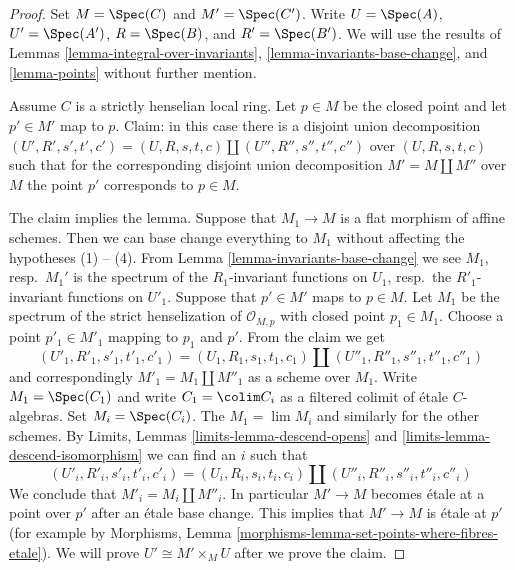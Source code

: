 \begin{proof}
Set $M = \Spec(C)$ and $M' = \Spec(C')$.
Write $U = \Spec(A)$, $U' = \Spec(A')$, $R = \Spec(B)$, and
$R' = \Spec(B')$. We will use the results of
Lemmas \ref{lemma-integral-over-invariants},
\ref{lemma-invariants-base-change}, and
\ref{lemma-points}
without further mention.

\medskip\noindent
Assume $C$ is a strictly henselian local ring. Let $p \in M$
be the closed point and let $p' \in M'$ map to $p$.
Claim: in this case there is a disjoint union decomposition
$(U', R', s', t', c') = (U, R, s, t, c) \amalg (U'', R'', s'', t'', c'')$
over $(U, R, s, t, c)$ such that for the corresponding
disjoint union decomposition $M' = M \amalg M''$ over $M$
the point $p'$ corresponds to $p \in M$.

\medskip\noindent
The claim implies the lemma. Suppose that $M_1 \to M$ is a flat morphism
of affine schemes. Then we can base change everything to $M_1$
without affecting the hypotheses (1) -- (4).
From Lemma \ref{lemma-invariants-base-change}
we see $M_1$, resp.\ $M_1'$ is the spectrum of the
$R_1$-invariant functions on $U_1$,
resp.\ the $R'_1$-invariant functions on $U'_1$.
Suppose that $p' \in M'$ maps to $p \in M$.
Let $M_1$ be the spectrum of the strict henselization of
$\mathcal{O}_{M, p}$ with closed point $p_1 \in M_1$.
Choose a point $p'_1 \in M'_1$ mapping to $p_1$ and $p'$.
From the claim we get
$$
(U'_1, R'_1, s'_1, t'_1, c'_1) =
(U_1, R_1, s_1, t_1, c_1) \amalg
(U''_1, R''_1, s''_1, t''_1, c''_1)
$$
and correspondingly $M'_1 = M_1 \amalg M''_1$ as a scheme over $M_1$.
Write $M_1 = \Spec(C_1)$ and write $C_1 = \colim C_i$ as a filtered
colimit of \'etale $C$-algebras. Set $M_i = \Spec(C_i)$.
The $M_1 = \lim M_i$ and similarly for the other schemes.
By Limits, Lemmas \ref{limits-lemma-descend-opens} and
\ref{limits-lemma-descend-isomorphism}
we can find an $i$ such that
$$
(U'_i, R'_i, s'_i, t'_i, c'_i) =
(U_i, R_i, s_i, t_i, c_i) \amalg
(U''_i, R''_i, s''_i, t''_i, c''_i)
$$
We conclude that $M'_i = M_i \amalg M''_i$. In particular
$M' \to M$ becomes \'etale at a point over $p'$ after an
\'etale base change. This implies that $M' \to M$ is \'etale at $p'$
(for example by Morphisms, Lemma
\ref{morphisms-lemma-set-points-where-fibres-etale}).
We will prove $U' \cong M' \times_M U$ after we prove the claim.


\end{proof}
